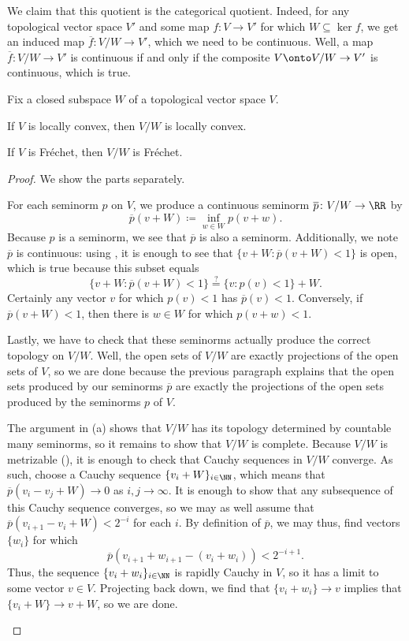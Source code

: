 \documentclass[notes.tex]{subfiles}
\begin{document}
\begin{remark}
	We claim that this quotient is the categorical quotient. Indeed, for any topological vector space $V'$ and some map $f\colon V\to V'$ for which $W\subseteq\ker f$, we get an induced map $\overline f\colon V/W\to V'$, which we need to be continuous. Well, a map $\overline f\colon V/W\to V'$ is continuous if and only if the composite $V\onto V/W\to V'$ is continuous, which is true.
\end{remark}
\begin{lemma}
	Fix a closed subspace $W$ of a topological vector space $V$.
	\begin{listalph}
		\item If $V$ is locally convex, then $V/W$ is locally convex.
		\item If $V$ is Fr\'echet, then $V/W$ is Fr\'echet.
	\end{listalph}
\end{lemma}
\begin{proof}
	We show the parts separately.
	\begin{listalph}
		\item For each seminorm $p$ on $V$, we produce a continuous seminorm $\overline p\colon V/W\to\RR$ by
		\[\overline p(v+W)\coloneqq\inf_{w\in W}p(v+w).\]
		Because $p$ is a seminorm, we see that $\overline p$ is also a seminorm. Additionally, we note $\overline p$ is continuous: using , it is enough to see that $\{v+W:\overline p(v+W)<1\}$ is open, which is true because this subset equals
		\[\{v+W:\overline p(v+W)<1\}\stackrel?=\{v:p(v)<1\}+W.\]
		Certainly any vector $v$ for which $p(v)<1$ has $\overline p(v)<1$. Conversely, if $\overline p(v+W)<1$, then there is $w\in W$ for which $p(v+w)<1$.

		Lastly, we have to check that these seminorms actually produce the correct topology on $V/W$. Well, the open sets of $V/W$ are exactly projections of the open sets of $V$, so we are done because the previous paragraph explains that the open sets produced by our seminorms $\overline p$ are exactly the projections of the open sets produced by the seminorms $p$ of $V$.

		\item The argument in (a) shows that $V/W$ has its topology determined by countable many seminorms, so it remains to show that $V/W$ is complete. Because $V/W$ is metrizable (), it is enough to check that Cauchy sequences in $V/W$ converge. As such, choose a Cauchy sequence $\{v_i+W\}_{i\in\NN}$, which means that $\overline p(v_i-v_j+W)\to0$ as $i,j\to\infty$. It is enough to show that any subsequence of this Cauchy sequence converges, so we may as well assume that $\overline p(v_{i+1}-v_i+W)<2^{-i}$ for each $i$. By definition of $\overline p$, we may thus, find vectors $\{w_i\}$ for which
		\[\overline p(v_{i+1}+w_{i+1}-(v_i+w_i))<2^{-i+1}.\]
		Thus, the sequence $\{v_i+w_i\}_{i\in\NN}$ is rapidly Cauchy in $V$, so it has a limit to some vector $v\in V$. Projecting back down, we find that $\{v_i+w_i\}\to v$ implies that $\{v_i+W\}\to v+W$, so we are done.
		\qedhere
	\end{listalph}
\end{proof}
\end{document}
